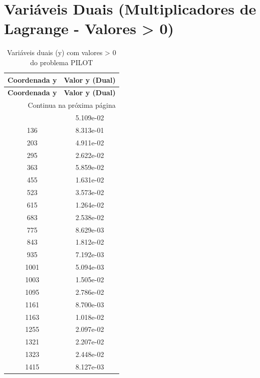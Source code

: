 \documentclass[12pt]{article}
\begin{document}
\section{Variáveis Duais (Multiplicadores de Lagrange - Valores > 0)}

\begin{longtable}{@{}cc@{}}
\caption{Variáveis duais (y) com valores > 0 do problema PILOT} \\
\toprule
\textbf{Coordenada y} & \textbf{Valor y (Dual)} \\
\midrule
\endfirsthead

\toprule
\textbf{Coordenada y} & \textbf{Valor y (Dual)} \\
\midrule
\endhead

\midrule \multicolumn{2}{r}{{Continua na próxima página}} \\ \midrule
\endfoot

\bottomrule
\endlastfoot
135 & 5.109e-02 \\
136 & 8.313e-01 \\
203 & 4.911e-02 \\
295 & 2.622e-02 \\
363 & 5.859e-02 \\
455 & 1.631e-02 \\
523 & 3.573e-02 \\
615 & 1.264e-02 \\
683 & 2.538e-02 \\
775 & 8.629e-03 \\
843 & 1.812e-02 \\
935 & 7.192e-03 \\
1001 & 5.094e-03 \\
1003 & 1.505e-02 \\
1095 & 2.786e-02 \\
1161 & 8.700e-03 \\
1163 & 1.018e-02 \\
1255 & 2.097e-02 \\
1321 & 2.207e-02 \\
1323 & 2.448e-02 \\
1415 & 8.127e-03 \\

\bottomrule
\end{longtable}
\end{document}
